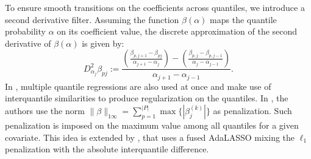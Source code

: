 To ensure smooth transitions on the coefficients across quantiles, we introduce a second derivative filter. Assuming the function $\beta(\alpha)$ maps the quantile probability $\alpha$ on its coefficient value, the discrete approximation of the second derivative of $\beta(\alpha)$ is given by:
\begin{equation}
D_{\alpha_j}^{2} \beta_{pj} := \frac{\left(\frac{\beta_{p,j+1}-\beta_{pj}}{\alpha_{j+1}-\alpha_{j}}\right)-\left(\frac{\beta_{p,j}-\beta_{p,j-1}}{\alpha_{j}-\alpha_{j-1}}\right)}{\alpha_{j+1}-\alpha_{j-1}}. 
\end{equation}
In \cite{zou_regularized_2008, jiang_interquantile_2014}, multiple quantile regressions are also used at once and make use of interquantile similarities to produce regularization on the quantiles. In \cite{zou_regularized_2008}, the authors use the norm $\| \beta \|_{1\infty}=\sum_{p=1}^{|P|} \max\{ |\beta_j^{(k)} |\}$ as penalization. Such penalization is imposed on the maximum value among all quantiles for a given covariate. This idea is extended by \cite{jiang_interquantile_2014}, that uses a fused AdaLASSO mixing the $\ell_1$ penalization with the absolute interquantile difference.

